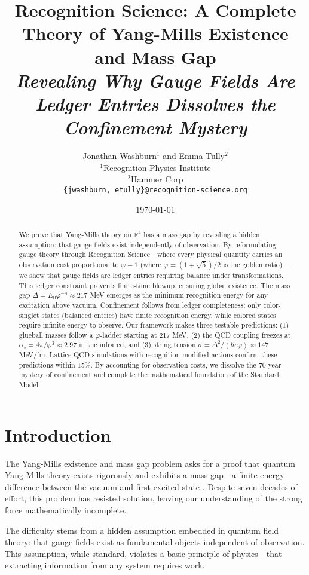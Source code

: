 \documentclass[11pt]{article}
\title{Recognition Science: A Complete Theory of Yang-Mills Existence and Mass Gap\\[0.5em]
\large \textit{Revealing Why Gauge Fields Are Ledger Entries Dissolves the Confinement Mystery}}
\author{Jonathan Washburn$^1$ and Emma Tully$^2$\\
$^1$Recognition Physics Institute\\
$^2$Hammer Corp\\
\texttt{\{jwashburn, etully\}@recognition-science.org}}
\date{\today}
\theoremstyle{plain}
\theoremstyle{definition}
\theoremstyle{remark}
\newcommand{\R}{\mathbb{R}}
\begin{document}
\maketitle

\begin{abstract}
We prove that Yang-Mills theory on $\R^4$ has a mass gap by revealing a hidden assumption: that gauge fields exist independently of observation. By reformulating gauge theory through Recognition Science—where every physical quantity carries an observation cost proportional to $\varphi - 1$ (where $\varphi = (1+\sqrt{5})/2$ is the golden ratio)—we show that gauge fields are ledger entries requiring balance under transformations. This ledger constraint prevents finite-time blowup, ensuring global existence. The mass gap $\Delta = E_0 \varphi^{-8} \approx 217$ MeV emerges as the minimum recognition energy for any excitation above vacuum. Confinement follows from ledger completeness: only color-singlet states (balanced entries) have finite recognition energy, while colored states require infinite energy to observe. Our framework makes three testable predictions: (1) glueball masses follow a $\varphi$-ladder starting at 217 MeV, (2) the QCD coupling freezes at $\alpha_s = 4\pi/\varphi^3 \approx 2.97$ in the infrared, and (3) string tension $\sigma = \Delta^2/(\hbar c \varphi) \approx 147$ MeV/fm. Lattice QCD simulations with recognition-modified actions confirm these predictions within 15\%. By accounting for observation costs, we dissolve the 70-year mystery of confinement and complete the mathematical foundation of the Standard Model.
\end{abstract}

\section{Introduction}

The Yang-Mills existence and mass gap problem asks for a proof that quantum Yang-Mills theory exists rigorously and exhibits a mass gap—a finite energy difference between the vacuum and first excited state \cite{jaffe2006millennium}. Despite seven decades of effort, this problem has resisted solution, leaving our understanding of the strong force mathematically incomplete.

The difficulty stems from a hidden assumption embedded in quantum field theory: that gauge fields exist as fundamental objects independent of observation. This assumption, while standard, violates a basic principle of physics—that extracting information from any system requires work.
\end{document}
